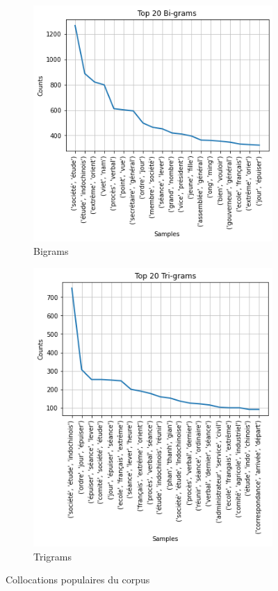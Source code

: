 \begin{figure}
\centering
\begin{subfigure}{0.6\textwidth}
    \includegraphics[width=\textwidth]{img/2.5.bigram.png}
    \caption{Bigrams}
    \label{fig:bigram}
\end{subfigure}
\hfill

\begin{subfigure}{0.6\textwidth}
    \includegraphics[width=\textwidth]{img/2.6.trigram.png}
    \caption{Trigrams}
    \label{fig:trigram}
\end{subfigure}
        
\caption{Collocations populaires du corpus}
\label{fig:ngrams}
\end{figure}
    
